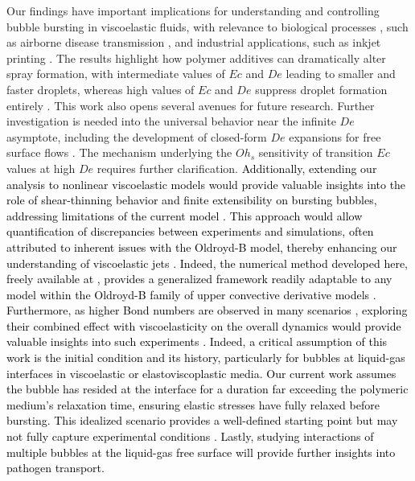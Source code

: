 \documentclass{jfm}
\newcommand{\VS}[1]{{\textcolor{black}{#1}}}
\newcommand{\oo}{\color{black} \normalfont}
\newcommand{\bb}{\color{black} \normalfont}
\begin{document}
Our findings have important implications for understanding and controlling bubble bursting in viscoelastic fluids, with relevance to biological processes \citep{walls2017quantifying}, such as airborne disease transmission \citep{bourouiba2021fluid}, and industrial applications, such as inkjet printing \citep{lohse2022fundamental}.
\oo
The results highlight how polymer additives can dramatically alter spray formation, with intermediate values of $Ec$ and $De$ leading to smaller and faster droplets, whereas high values of $Ec$ and $De$ suppress droplet formation entirely \citep{kant2023bag}.
\bb
This work also opens several avenues for future research. Further investigation is needed into the universal behavior near the infinite $De$ asymptote, including the development of closed-form $De$ expansions for free surface flows \citep{sen2021retraction,francca2024elasto,sen2024elastocapillary,boyko2024flow,hinch2024fast}. The mechanism underlying the $Oh_s$ sensitivity of transition $Ec$ values at high $De$ requires further clarification. \VS{Additionally, extending our analysis to nonlinear viscoelastic models would provide valuable insights into the role of shear-thinning behavior and finite extensibility on bursting bubbles, addressing limitations of the current model \citep{zinelis2023transition,mckinley2002filament,snoeijer2020relationship}. This approach would allow quantification of discrepancies between experiments and simulations, often attributed to inherent issues with the Oldroyd-B model, thereby enhancing our understanding of viscoelastic jets \citep{gaillard2024does}.
Indeed, the numerical method developed here, freely available at \citet{Sanjay2024code}, provides a generalized framework readily adaptable to any model within the Oldroyd-B family of upper convective derivative models \citep{snoeijer2020relationship}.
Furthermore, as higher Bond numbers are observed in many scenarios \citep{walls2015jet, ghabache2014liquid, deike2018dynamics, krishnan2017scaling}, exploring their combined effect with viscoelasticity on the overall dynamics would provide valuable insights into such experiments \citep{rodriguez2023bubble}.
\oo
Indeed, a critical assumption of this work is the initial condition and its history, particularly for bubbles at liquid-gas interfaces in viscoelastic or elastoviscoplastic media. Our current work assumes the bubble has resided at the interface for a duration far exceeding the polymeric medium's relaxation time, ensuring elastic stresses have fully relaxed before bursting. This idealized scenario provides a well-defined starting point but may not fully capture experimental conditions \citep{cheny1996extravagant,deoclecio2023drop}.
\bb
Lastly, studying interactions of multiple bubbles \citep{singh2019numerical} at the liquid-gas free surface will provide further insights into pathogen transport.}
\end{document}

